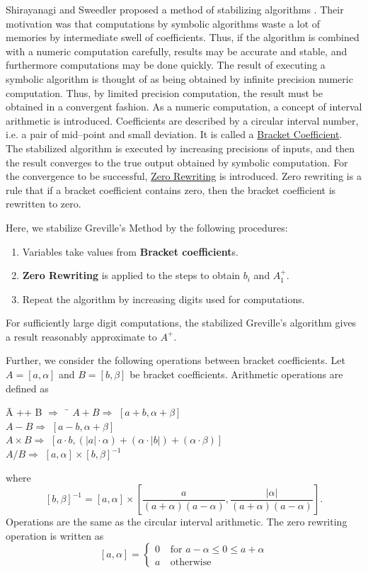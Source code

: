 Shirayanagi and Sweedler proposed a method of 
stabilizing algorithms \cite{SS95}.  Their motivation 
was that computations by symbolic algorithms waste 
a lot of memories by intermediate swell of 
coefficients.  Thus, if the algorithm is combined 
with a numeric computation carefully, results may 
be accurate and stable, and furthermore computations 
may be done quickly.  
The result of executing a symbolic algorithm is thought of as
being obtained by infinite precision numeric computation.
Thus, by limited precision computation, the result must 
be obtained in a convergent fashion.  As a numeric computation, a 
concept of interval arithmetic is introduced.  
Coefficients are described by a circular interval 
number, i.e. a pair of mid--point and small 
deviation.  It is called a \underline{Bracket 
Coefficient}.  The stabilized algorithm is executed by 
increasing precisions of inputs, and then the result converges 
to the true output obtained by symbolic computation.  
For the convergence to be successful,
\underline{Zero Rewriting} is introduced.  
Zero rewriting is a rule that if a bracket coefficient 
contains zero, then the bracket coefficient is rewritten 
to zero. \par 
Here, we stabilize Greville's Method by 
the following procedures:  
\begin{enumerate}
\item Variables take values from {\bf Bracket coefficient}s.
\item {\bf Zero Rewriting} is applied to 
the steps to obtain  $b_i $ and $A_1^+ $.
\item Repeat the algorithm by increasing digits used for 
computations.
\end{enumerate}
For sufficiently large digit computations, the stabilized 
Greville's algorithm gives a result reasonably approximate 
to $A^+ $. \par
Further, we consider the following operations between 
bracket coefficients.  Let  $A = [a,\alpha] $ and 
$B = [b,\beta]$ be bracket coefficients.  Arithmetic 
operations are defined as 
\begin{tabbing}
\hspace*{2em} \= A ++ B $\Rightarrow $ \ \= \kill
\> $A + B \Rightarrow $ \> $[a+b, \alpha+\beta] $ \\
\> $A - B \Rightarrow $ \> $[a-b, \alpha+\beta] $ \\
\> $A \times B \Rightarrow $ \> $[a \cdot b, 
(|a| \cdot \alpha)+ (\alpha \cdot |b|) + 
(\alpha \cdot \beta) ] $ \\
\> $A / B \Rightarrow $ \> $[a,\alpha] \times 
[b,\beta]^{-1} $ \\
\end{tabbing}
where
$$ [b,\beta]^{-1} = [a,\alpha] \times 
[\frac{a}{(a+\alpha)(a-\alpha)},
\frac{|\alpha|}{(a+\alpha)(a-\alpha)}] . $$
Operations are the same as the circular interval 
arithmetic.  The zero rewriting operation is 
written as 
$$ [a,\alpha] = \left\{ \begin{array}{ll}
 0 \ & \mbox{for } a-\alpha \leq 0 \leq a+\alpha \\
 a \ & \mbox{otherwise} 
\end{array} \right. $$

